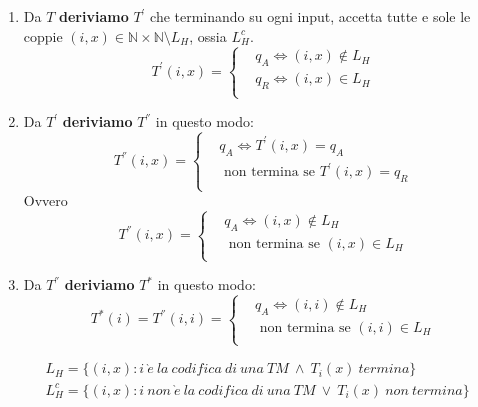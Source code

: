 \begin{enumerate}
    \item []{
        Da $T$ \textbf{deriviamo} $T^{'}$ che terminando su ogni input, accetta tutte e sole le coppie $(i, x) \in \mathbb{N} \times \mathbb{N} \setminus L_{H}$, ossia $L_{H}^{c}$.
        \[
            T^{'}(i, x) = 
            \begin{cases} 
                & q_{A} \Leftrightarrow (i, x)\notin L_{H}\\
                & q_{R} \Leftrightarrow (i, x)\in L_{H}\\
            \end{cases}
        \]
        
    }
    \item []{
        Da $T^{'}$ \textbf{deriviamo} $T^{''}$ in questo modo:\\
        \[
            T^{''}(i, x) = 
            \begin{cases} 
                & q_{A} \Leftrightarrow T^{'}(i, x) = q_{A}\\
                & \text{ non termina se } T^{'}(i, x) = q_{R}\\
            \end{cases}
        \]
        Ovvero
        \[
            T^{''}(i, x) = 
            \begin{cases} 
                & q_{A} \Leftrightarrow (i, x) \notin L_{H}\\
                & \text{ non termina se } (i, x) \in L_{H}\\
            \end{cases}
        \]
    }
    \item []{
        Da $T^{''}$ \textbf{deriviamo} $T^{*}$ in questo modo:
        \[
            T^{*}(i) = T^{''}(i, i) =
            \begin{cases} 
                & q_{A} \Leftrightarrow (i, i) \notin L_{H}\\
                & \text{ non termina se } (i, i) \in L_{H}\\
            \end{cases}
        \]
    }
\end{enumerate}


    \begin{align*}
        & L_{H} = \{(i, x): i\ \grave{e}\ la\ codifica\ di\ una\ TM\ \land\ T_{i}(x)\ termina\}\\
        & L_{H}^c = \{(i, x): i\ non\ \grave{e}\ la\ codifica\ di\ una\ TM\ \lor\ T_{i}(x)\ non\ termina\}
    \end{align*}


